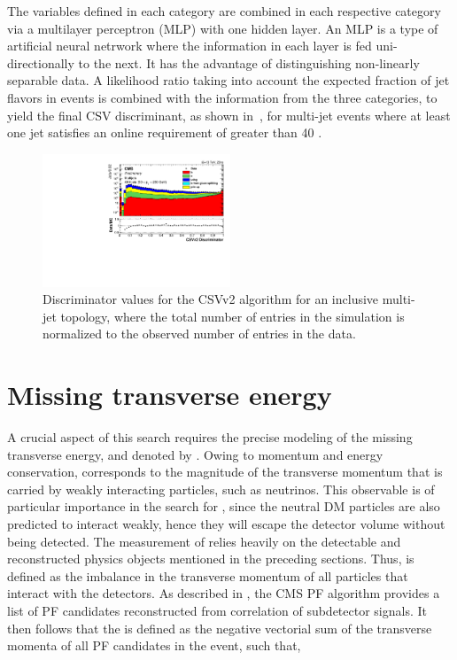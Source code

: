 The variables defined in each category are combined in each respective category via a multilayer perceptron (MLP) with one hidden layer. An MLP is a type of artificial neural netrwork where the information in each layer is fed uni-directionally to the next. It has the advantage of distinguishing non-linearly separable data. A likelihood ratio taking into account the expected fraction of jet flavors in \ttbar events is combined with the information from the three categories, to yield the final CSV discriminant, as shown in~, for multi-jet events where at least one jet satisfies an online \pt requirement of greater than 40 \GeV.

\begin{figure}
\centering
\includegraphics[width=0.5\textwidth]{figs/csvv2_multijet_13TeV.pdf}
\caption{Discriminator values for the CSVv2 algorithm for an inclusive multi-jet topology, where the total number of entries in the simulation is normalized to the observed number of entries in the data.}
\label{fig:CSVv2_multijet}
\end{figure}

\section{Missing transverse energy}
\label{sec:MET}
A crucial aspect of this search requires the precise modeling of the missing transverse energy, and denoted by \ptmiss. Owing to momentum and energy conservation, \ptmiss corresponds to the magnitude of the transverse momentum that is carried by weakly interacting particles, such as neutrinos. This observable is of particular importance in the search for \ttDM, since the neutral DM particles are also predicted to interact weakly, hence they will escape the detector volume without being detected. The measurement of \ptmiss relies heavily on the detectable and reconstructed physics objects mentioned in the preceding sections. Thus, \ptmiss is defined as the imbalance in the transverse momentum of all particles that interact with the detectors. As described in , the CMS PF algorithm provides a list of PF candidates reconstructed from correlation of subdetector signals. It then follows that the \ptvecmiss is defined as the negative vectorial sum of the transverse momenta of all PF candidates in the event, such that,

